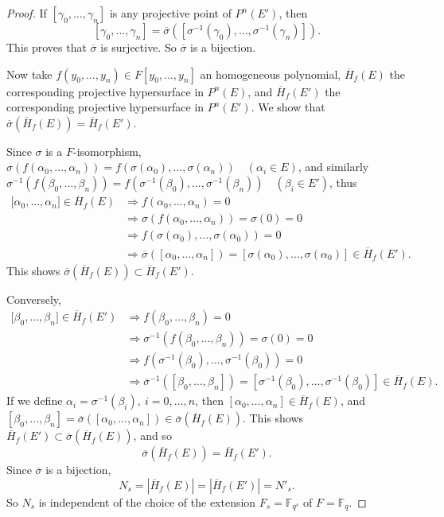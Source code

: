 \documentclass[11pt,a4paper]{article}
\newcommand{\F}{\mathbb{F}}
\begin{document}
\begin{proof}
 If $[\gamma_0,\ldots,\gamma_n] $ is any projective point of $P^n(E')$, then 
 $$[\gamma_0,\ldots,\gamma_n] = \overline{\sigma}([\sigma^{-1}(\gamma_0),\ldots,\sigma^{-1}(\gamma_n)]).$$ This proves that $\overline{\sigma}$ is surjective. So $\overline{\sigma}$ is a bijection.
 
 Now take $f(y_0,\ldots,y_n)\in F[y_0,\ldots,y_n]$ an homogeneous polynomial, $\overline{H}_f(E)$ the corresponding projective hypersurface in $P^n(E)$, and $\overline{H}_f(E')$  the corresponding projective hypersurface in $P^n(E')$. We show that $\overline{\sigma}(\overline{H}_f(E)) = \overline{H}_f(E')$.
 
 Since $\sigma$ is a $F$-isomorphism, $\sigma(f(\alpha_0,\ldots,\alpha_n)) = f(\sigma(\alpha_0),\ldots,\sigma(\alpha_n))\quad (\alpha_i \in E)$, and similarly $\sigma^{-1}(f(\beta_0,\ldots,\beta_n)) = f(\sigma^{-1} (\beta_0),\ldots, \sigma^{-1}(\beta_n))\quad  (\beta_i \in E')$, thus
 \begin{align*}
 {[}\alpha_0,\ldots,\alpha_n{]} \in  \overline{H}_f(E)
 &\Rightarrow f(\alpha_0,\ldots,\alpha_n) = 0 \\
 &\Rightarrow \sigma(f(\alpha_0,\ldots,\alpha_n)) = \sigma(0) = 0\\
 & \Rightarrow f(\sigma(\alpha_0),\ldots,\sigma(\alpha_0)) = 0\\
 &\Rightarrow \overline{\sigma}([\alpha_0,\ldots,\alpha_n]) = [\sigma(\alpha_0),\ldots,\sigma(\alpha_0)] \in \overline{H}_f(E').
\end{align*}
This shows $\overline{\sigma}(\overline{H}_f(E)) \subset \overline{H}_f(E')$.

Conversely, 
 \begin{align*}
 {[}\beta_0,\ldots,\beta_n{]} \in  \overline{H}_f(E')
 &\Rightarrow f(\beta_0,\ldots,\beta_n) = 0 \\
 &\Rightarrow \sigma^{-1}(f(\beta_0,\ldots,\beta_n)) = \sigma(0) = 0\\
 & \Rightarrow f(\sigma^{-1}(\beta_0),\ldots,\sigma^{-1}(\beta_0)) = 0\\
 &\Rightarrow \overline{\sigma}^{-1}([\beta_0,\ldots,\beta_n]) = [\sigma^{-1}(\beta_0),\ldots,\sigma^{-1}(\beta_0)] \in \overline{H}_f(E).
\end{align*}
If we define $\alpha_i = \sigma^{-1}(\beta_i),\ i=0,\ldots,n$, then $[\alpha_0,\ldots,\alpha_n] \in \overline{H}_f(E)$, and $[\beta_0,\ldots,\beta_n] = \overline{\sigma}([\alpha_0,\ldots,\alpha_n]) \in \overline{\sigma}(\overline{H}_f(E))$. This shows $ \overline{H}_f(E') \subset \overline{\sigma}(\overline{H}_f(E))$, and so
$$\overline{\sigma}(\overline{H}_f(E)) = \overline{H}_f(E').$$
Since $\overline{\sigma}$ is a bijection,
$$N_s = |\overline{H}_f(E)| = |\overline{H}_f(E')| = N'_s.$$
So $N_s$ is independent of the choice of the extension $F_s = \F_{q^s}$ of $F = \F_q$.
\end{proof}
\end{document}

